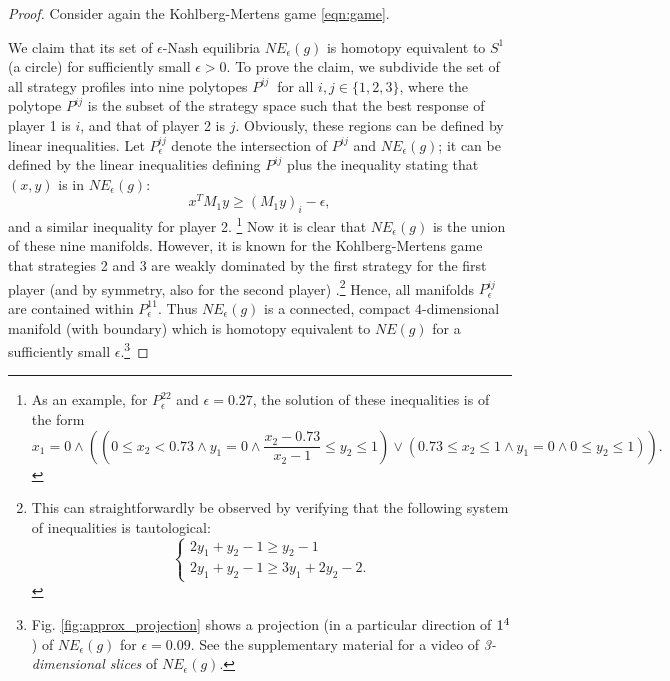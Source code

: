 \documentclass[11pt]{article}
\begin{document}
\begin{proof}
Consider again the Kohlberg-Mertens game \eqref{eqn:game}.

We claim that its set of $\epsilon$-Nash equilibria $NE_{\epsilon}(g)$ is homotopy equivalent to $S^1$ (a circle) for
sufficiently small $\epsilon > 0$.  To prove the claim, we subdivide the set of all strategy profiles into nine polytopes $P^{ij}\ $ for all $ i,j \in\{1,2,3\}$, where the polytope $P^{ij}$ is the subset of the strategy space such that the best response of player 1 is $i$, and that of player 2 is $j$. Obviously, these regions can be defined by linear inequalities.  Let $P^{ij}_{\epsilon}$ denote the intersection of $P^{ij}$ and $NE_{\epsilon}(g)$; it can be defined by the linear inequalities defining $P^{ij}$ plus the inequality stating that $(x,y)$ is in $NE_\epsilon(g)$:
\[ x^T M_1 y \geq (M_1 y)_i - \epsilon, \]
and a similar inequality for player 2.
\footnote{As an example, for $P^{22}_{\epsilon}$ and $\epsilon=0.27$, the solution of these inequalities is of the form
\[
x_1=0\land \left(\left(0\leq x_2<0.73\land y_1=0\land \frac{x_2-0.73}{x_2-1}\leq y_2\leq 1\right)\lor \left(0.73\leq x_2\leq 1\land y_1=0\land 0\leq y_2\leq 1\right)\right) .
\]}
Now it is clear that $NE_{\epsilon}(g)$ is the union of these nine manifolds.
However, it is known for the Kohlberg-Mertens game  that strategies 2 and 3 are weakly dominated by the first strategy for the first player (and by symmetry, also for the second player) \citep{DemichelisRitzberger}.\footnote{This can straightforwardly be observed by verifying that the following system of inequalities is tautological:
\[
\begin{cases}
2y_1 + y_2 - 1 \geq y_2 - 1 \\
2y_1 + y_2 - 1 \geq 3y_1 + 2y_2 - 2.
\end{cases}
\]}
Hence, all manifolds $P^{ij}_\epsilon$ are contained within $P^{11}_\epsilon$. Thus $NE_\epsilon(g)$ is a connected, compact $4$-dimensional manifold (with boundary) which is homotopy equivalent to $NE(g)$ for a sufficiently small $\epsilon$.\footnote{Fig. \ref{fig:approx_projection} shows a projection (in a particular direction of $1^4$) of $NE_\epsilon(g)$ for $\epsilon = 0.09$.  See the supplementary material for a video of {\em 3-dimensional slices} of $NE_\epsilon(g)$. 
}
\end{proof}
\end{document}
